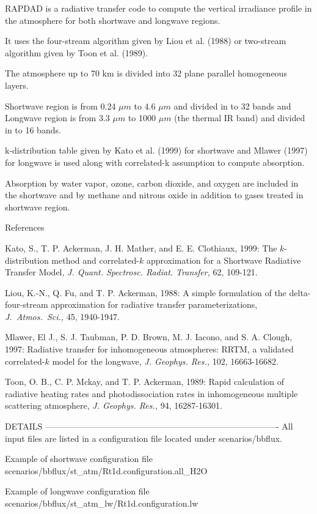 RAPDAD is a radiative transfer code to compute the vertical irradiance profile in the atmosphere for both shortwave and longwave regions.

It uses the four-stream algorithm given by Liou et al. (1988) or two-stream algorithm given by Toon et al. (1989).

The atmosphere up to 70 km is divided into 32 plane parallel homogeneous layers.

Shortwave region is from 0.24 $\mu m$ to 4.6 $\mu m$ and divided in to 32 bands and Longwave region is from 3.3 $\mu m$ to 1000 $\mu m$ (the thermal IR band) and divided in to 16 bands.

k-distribution table given by Kato et al. (1999) for shortwave and Mlawer (1997) for longwave is used along with correlated-k assumption to compute absorption.

Absorption by water vapor, ozone, carbon dioxide, and oxygen are included in the shortwave and by methane and nitrous oxide in addition to gases treated in shortwave region.

References

Kato, S., T. P. Ackerman, J. H. Mather, and E. E. Clothiaux, 1999: The $k$-distribution method and correlated-$k$ approximation for a Shortwave Radiative Transfer Model, {\it J. Quant. Spectrosc. Radiat. Transfer,} 62, 109-121.

Liou, K.-N., Q. Fu, and T. P. Ackerman, 1988:
A simple formulation of the delta-four-stream approximation for radiative transfer parameterizations, {\it J.\ Atmos.\ Sci.,} 45, 1940-1947.

Mlawer, El J., S. J. Taubman, P. D. Brown, M. J. Iacono, and S. A. Clough, 1997:
Radiative transfer for inhomogeneous atmospheres: RRTM, a validated correlated-$k$ model for the longwave, {\it J. Geophys. Res.,} 102, 16663-16682. 

Toon, O. B., C. P. Mckay, and T. P. Ackerman, 1989:
Rapid calculation of radiative heating rates and photodissociation rates in inhomogeneous multiple scattering atmosphere, {\it J. Geophys. Res.,} 94, 16287-16301.

DETAILS ----------------------------------------------------------------------------------
All input files are listed in a configuration file located under scenarios/bbflux.

Example of shortwave configuration file
scenarios/bbflux/st_atm/Rt1d.configuration.all_H2O

Example of longwave configuration file
scenarios/bbflux/st_atm_lw/Rt1d.configuration.lw

